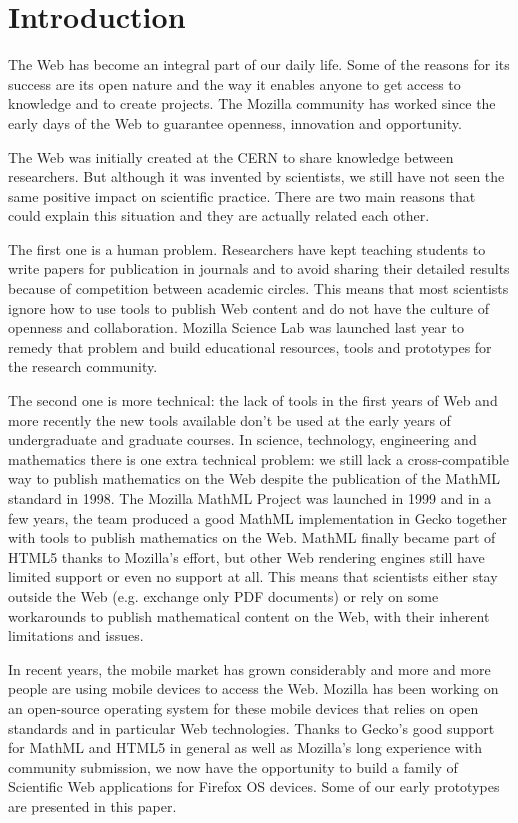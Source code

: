 \chapter*{Introduction}

The Web has become an integral part of our daily life. Some of the reasons for
its success are its open nature and the way it enables anyone to get access to
knowledge and to create projects. The Mozilla community has worked since
the early days of the Web to guarantee openness, innovation and opportunity.

The Web was initially created at the CERN to share knowledge between
researchers. But although it was invented by scientists, we still have not seen
the same positive impact on scientific practice. There are two main reasons that
could explain this situation and they are actually related each other.

The first one is a human problem. Researchers have kept teaching students
to write papers for publication in journals and to avoid sharing their detailed
results because of competition between academic circles. This means that most
scientists ignore
how to use tools to publish Web content and do not have the culture of openness
and collaboration. Mozilla Science Lab was launched last year to remedy that
problem and build educational resources, tools and prototypes for the research
community.

The second one is more technical:
the lack of tools in the first years of Web and more recently the new tools
available don't be used at the early years of undergraduate and graduate
courses. In science, technology, engineering and mathematics there is one extra
technical problem:
we still lack a cross-compatible way to publish
mathematics on the Web despite the publication of the MathML standard in 1998.
The Mozilla MathML Project
was launched in 1999 and in a few years, the team produced a good MathML
implementation in Gecko together with tools to publish mathematics on the Web.
MathML finally
became part of HTML5 thanks to Mozilla's effort, but other Web rendering
engines still have limited support or even no support at all. This means that
scientists either stay outside the Web (e.g. exchange only PDF documents) or
rely on some workarounds to publish mathematical content on the Web, with
their inherent limitations and issues.

In recent years, the mobile market has grown considerably and more and more
people are using mobile devices to access the Web. Mozilla has been working
on an open-source operating system for these mobile devices that
relies on open standards and in particular Web technologies. Thanks to
Gecko's good support for MathML and HTML5 in general as well as
Mozilla's long experience with community submission, we now have the opportunity
to build a family of Scientific Web applications for Firefox OS devices.
Some of our early prototypes are presented in this paper.

